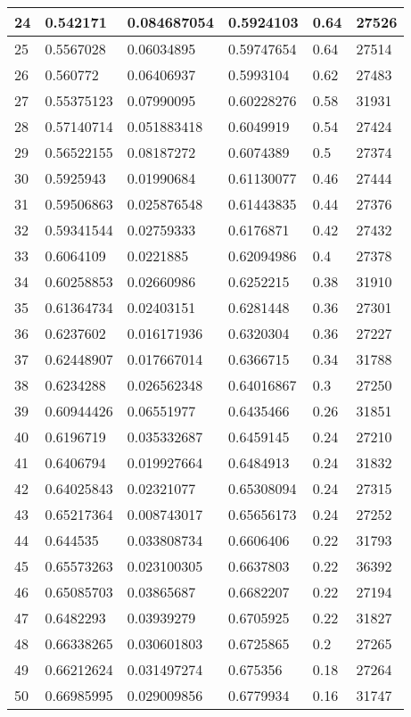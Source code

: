 \begin{longtable}{|l|l|l|l|l|l|}
24 & 0.542171 & 0.084687054 & 0.5924103 & 0.64 & 27526 \\ \hline 
25 & 0.5567028 & 0.06034895 & 0.59747654 & 0.64 & 27514 \\ \hline 
26 & 0.560772 & 0.06406937 & 0.5993104 & 0.62 & 27483 \\ \hline 
27 & 0.55375123 & 0.07990095 & 0.60228276 & 0.58 & 31931 \\ \hline 
28 & 0.57140714 & 0.051883418 & 0.6049919 & 0.54 & 27424 \\ \hline 
29 & 0.56522155 & 0.08187272 & 0.6074389 & 0.5 & 27374 \\ \hline 
30 & 0.5925943 & 0.01990684 & 0.61130077 & 0.46 & 27444 \\ \hline 
31 & 0.59506863 & 0.025876548 & 0.61443835 & 0.44 & 27376 \\ \hline 
32 & 0.59341544 & 0.02759333 & 0.6176871 & 0.42 & 27432 \\ \hline 
33 & 0.6064109 & 0.0221885 & 0.62094986 & 0.4 & 27378 \\ \hline 
34 & 0.60258853 & 0.02660986 & 0.6252215 & 0.38 & 31910 \\ \hline 
35 & 0.61364734 & 0.02403151 & 0.6281448 & 0.36 & 27301 \\ \hline 
36 & 0.6237602 & 0.016171936 & 0.6320304 & 0.36 & 27227 \\ \hline 
37 & 0.62448907 & 0.017667014 & 0.6366715 & 0.34 & 31788 \\ \hline 
38 & 0.6234288 & 0.026562348 & 0.64016867 & 0.3 & 27250 \\ \hline 
39 & 0.60944426 & 0.06551977 & 0.6435466 & 0.26 & 31851 \\ \hline 
40 & 0.6196719 & 0.035332687 & 0.6459145 & 0.24 & 27210 \\ \hline 
41 & 0.6406794 & 0.019927664 & 0.6484913 & 0.24 & 31832 \\ \hline 
42 & 0.64025843 & 0.02321077 & 0.65308094 & 0.24 & 27315 \\ \hline 
43 & 0.65217364 & 0.008743017 & 0.65656173 & 0.24 & 27252 \\ \hline 
44 & 0.644535 & 0.033808734 & 0.6606406 & 0.22 & 31793 \\ \hline 
45 & 0.65573263 & 0.023100305 & 0.6637803 & 0.22 & 36392 \\ \hline 
46 & 0.65085703 & 0.03865687 & 0.6682207 & 0.22 & 27194 \\ \hline 
47 & 0.6482293 & 0.03939279 & 0.6705925 & 0.22 & 31827 \\ \hline 
48 & 0.66338265 & 0.030601803 & 0.6725865 & 0.2 & 27265 \\ \hline 
49 & 0.66212624 & 0.031497274 & 0.675356 & 0.18 & 27264 \\ \hline 
50 & 0.66985995 & 0.029009856 & 0.6779934 & 0.16 & 31747 \\ \hline 
\end{longtable}